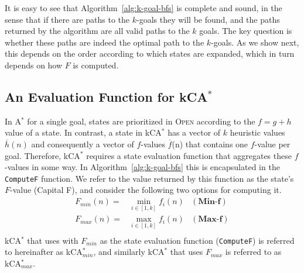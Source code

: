 \documentclass{aicom2e}
\newcommand{\astar}{A$^*$}
\newcommand{\kastar}{kCA$^*$}
\newcommand{\kastarmin}{kCA$^*_{min}$}
\newcommand{\kastarmax}{kCA$^*_{max}$}
\newcommand{\minf}{Min-f}
\newcommand{\maxf}{Max-f}
\newcommand{\open}{\textsc{Open}}
\begin{document}
It is easy to see that Algorithm~\ref{alg:k-goal-bfs} is complete and sound, in
the sense that if there are paths to the $k$-goals they will be found, and the
paths returned by the algorithm are all valid paths to the $k$ goals. The key
question is whether these paths are indeed the optimal path to the $k$-goals.
As we show next, this depends on the order according to which states are
expanded,
which in turn depends on how $F$ is computed. %


\subsection{An Evaluation Function for \kastar{}}

In \astar{} for a single goal, states are prioritized in \open{} according to
the $f=g+h$ value of a state. In contrast, a state in \kastar{} has a vector of
$k$ heuristic values $\overline{h}(n)$ and consequently a vector of $f$-values
$\overline{f}$(n) that contains one $f$-value per goal. Therefore, \kastar{}
requires a state evaluation function that aggregates these $f$-values in some
way. In Algorithm~\ref{alg:k-goal-bfs} this is encapsulated in the {\tt
ComputeF} function. We refer to the value returned by this function as the
state's $F$-value (Capital F), and consider the following two options for
computing it.
\begin{align}
F_{min}(n)=&\min_{i\in [1,k]}f_i(n) & (\textbf{\minf})\\
F_{max}(n)=&\max_{i\in [1,k]}f_i(n) & (\textbf{\maxf})\\
\end{align}
\kastar{} that uses with $F_{min}$ as the state evaluation function ({\tt ComputeF})
is referred to hereinafter as \kastarmin{}, and similarly \kastar{} that uses $F_{max}$ is referred to
as \kastarmax{}.


\end{document}
